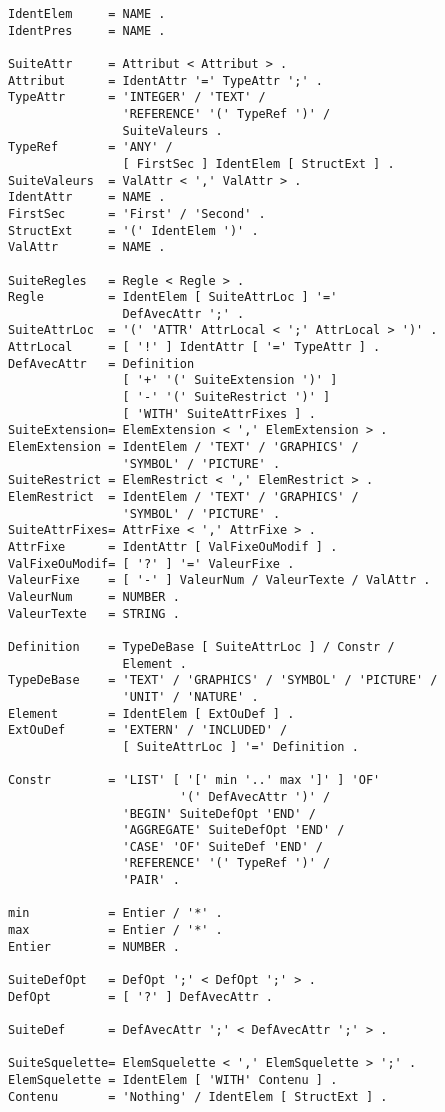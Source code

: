 {\begin{verbatim}
IdentElem     = NAME .
IdentPres     = NAME .

SuiteAttr     = Attribut < Attribut > .
Attribut      = IdentAttr '=' TypeAttr ';' .
TypeAttr      = 'INTEGER' / 'TEXT' /
                'REFERENCE' '(' TypeRef ')' /
                SuiteValeurs .
TypeRef       = 'ANY' /
                [ FirstSec ] IdentElem [ StructExt ] .
SuiteValeurs  = ValAttr < ',' ValAttr > .
IdentAttr     = NAME .
FirstSec      = 'First' / 'Second' .
StructExt     = '(' IdentElem ')' .
ValAttr       = NAME .

SuiteRegles   = Regle < Regle > .
Regle         = IdentElem [ SuiteAttrLoc ] '='
                DefAvecAttr ';' .
SuiteAttrLoc  = '(' 'ATTR' AttrLocal < ';' AttrLocal > ')' .
AttrLocal     = [ '!' ] IdentAttr [ '=' TypeAttr ] .
DefAvecAttr   = Definition
                [ '+' '(' SuiteExtension ')' ]
                [ '-' '(' SuiteRestrict ')' ]
                [ 'WITH' SuiteAttrFixes ] .
SuiteExtension= ElemExtension < ',' ElemExtension > .
ElemExtension = IdentElem / 'TEXT' / 'GRAPHICS' /
                'SYMBOL' / 'PICTURE' .
SuiteRestrict = ElemRestrict < ',' ElemRestrict > .
ElemRestrict  = IdentElem / 'TEXT' / 'GRAPHICS' /
                'SYMBOL' / 'PICTURE' .
SuiteAttrFixes= AttrFixe < ',' AttrFixe > .
AttrFixe      = IdentAttr [ ValFixeOuModif ] .
ValFixeOuModif= [ '?' ] '=' ValeurFixe .
ValeurFixe    = [ '-' ] ValeurNum / ValeurTexte / ValAttr .
ValeurNum     = NUMBER .
ValeurTexte   = STRING .

Definition    = TypeDeBase [ SuiteAttrLoc ] / Constr /
                Element .
TypeDeBase    = 'TEXT' / 'GRAPHICS' / 'SYMBOL' / 'PICTURE' /
                'UNIT' / 'NATURE' .
Element       = IdentElem [ ExtOuDef ] .
ExtOuDef      = 'EXTERN' / 'INCLUDED' /
                [ SuiteAttrLoc ] '=' Definition .

Constr        = 'LIST' [ '[' min '..' max ']' ] 'OF'
                        '(' DefAvecAttr ')' /
                'BEGIN' SuiteDefOpt 'END' /
                'AGGREGATE' SuiteDefOpt 'END' /
                'CASE' 'OF' SuiteDef 'END' /
                'REFERENCE' '(' TypeRef ')' /
                'PAIR' .

min           = Entier / '*' .
max           = Entier / '*' .
Entier        = NUMBER .

SuiteDefOpt   = DefOpt ';' < DefOpt ';' > .
DefOpt        = [ '?' ] DefAvecAttr .

SuiteDef      = DefAvecAttr ';' < DefAvecAttr ';' > .

SuiteSquelette= ElemSquelette < ',' ElemSquelette > ';' .
ElemSquelette = IdentElem [ 'WITH' Contenu ] .
Contenu       = 'Nothing' / IdentElem [ StructExt ] .


\end{verbatim}}
